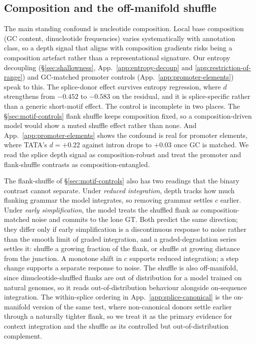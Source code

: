 \documentclass{article}
\theoremstyle{plain}
\theoremstyle{definition}
\theoremstyle{remark}
\begin{document}
\subsection{Composition and the off-manifold shuffle}
\label{app:lim-composition}
The main standing confound is nucleotide composition. Local base
composition (GC content, dinucleotide frequencies) varies systematically
with annotation class, so a depth signal that aligns with composition
gradients risks being a composition artefact rather than a
representational signature. Our entropy decoupling
(\S\ref{sec:shallowness}, App.~\ref{app:entropy-decoup} and
\ref{app:restriction-of-range}) and GC-matched promoter controls
(App.~\ref{app:promoter-elements}) speak to this. The splice-donor
effect survives entropy regression, where $d$ strengthens from
$-0.452$ to $-0.583$ on the residual, and it is splice-specific rather
than a generic short-motif effect. The control is incomplete in two
places. The \S\ref{sec:motif-controls} flank shuffle keeps composition
fixed, so a composition-driven model would show a muted shuffle effect
rather than none. And App.~\ref{app:promoter-elements} shows the
confound is real for promoter elements, where TATA's $d=+0.22$ against
intron drops to $+0.03$ once GC is matched. We read the splice depth
signal as composition-robust and treat the promoter and flank-shuffle
contrasts as composition-entangled.

The flank-shuffle of \S\ref{sec:motif-controls} also has two readings
that the binary contrast cannot separate. Under \emph{reduced
integration}, depth tracks how much flanking grammar the model
integrates, so removing grammar settles $c$ earlier. Under \emph{early
simplification}, the model treats the shuffled flank as
composition-matched noise and commits to the lone GT. Both predict the
same direction; they differ only if early simplification is a
discontinuous response to noise rather than the smooth limit of graded
integration, and a graded-degradation series settles it: shuffle a
growing fraction of the flank, or shuffle at growing distance from the
junction. A monotone shift in $c$ supports reduced integration; a step
change supports a separate response to noise. The shuffle is also
off-manifold, since dinucleotide-shuffled flanks are out of
distribution for a model trained on natural genomes, so it reads
out-of-distribution behaviour alongside on-sequence integration. The
within-splice ordering in App.~\ref{app:splice-canonical} is the
on-manifold version of the same test, where non-canonical donors
settle earlier through a naturally tighter flank, so we treat it as
the primary evidence for context integration and the shuffle as its
controlled but out-of-distribution complement.
\end{document}
